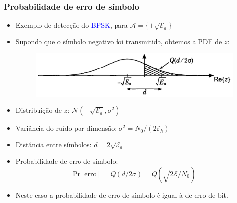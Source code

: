 \begin{frame}
	\frametitle{Probabilidade de erro de símbolo}

	\begin{itemize}
	    \item Exemplo de detecção do \textcolor{blue}{BPSK}, para $\mathcal{A}=\{\pm \sqrt{\mathcal{E}_a} \}$
	    \item Supondo que o símbolo negativo foi transmitido, obtemos a PDF de $z$:
	    \begin{figure}[t]	
	      \begin{center}
		\includegraphics[width=0.6\columnwidth]{figs/pam_43}
	      \end{center}
	    \end{figure}
	    \item Distribuição de $z$: $\mathcal{N}(-\sqrt{\mathcal{E}_a},\sigma^2)$
	    \item Variância do ruído por dimensão: $\sigma^2 = N_0/(2\mathcal{E}_h)$
	    \item Distância entre símbolos: $d=2\sqrt{\mathcal{E}_a}$
	    \item Probabilidade de erro de símbolo:
	    \begin{equation*}
		    \mathrm{Pr[erro]} = Q(d/2\sigma) = Q(\sqrt{2\mathcal{E}/N_0})
	    \end{equation*}
	    \item Neste caso a probabilidade de erro de símbolo é igual à de erro de bit.
	\end{itemize}	
\end{frame}

